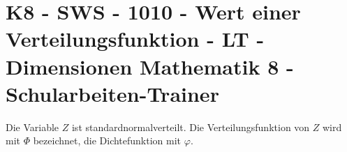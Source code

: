 \section{K8 - SWS - 1010 - Wert einer Verteilungsfunktion - LT - Dimensionen Mathematik 8 - Schularbeiten-Trainer}

\begin{beispiel}[K8 - SWS]{1}
Die Variable $Z$ ist standardnormalverteilt. Die Verteilungsfunktion von $Z$ wird mit $\Phi$ bezeichnet, die Dichtefunktion mit $\varphi$.

\end{beispiel}